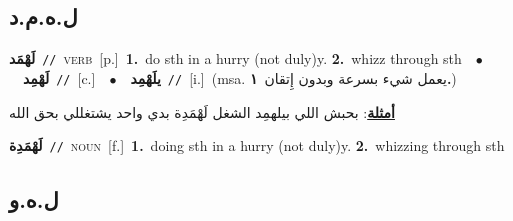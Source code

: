 \documentclass[10pt,a4paper,twoside]{article} %
\begin{document}
\begin{multicols}{2}
\vspace{-3mm}
\subsection*{\color{blue}\foreignlanguage{arabic}{ل.ه.م.د}\color{blue}{}} 

{\setlength\topsep{0pt}\textbf{\foreignlanguage{arabic}{لَهْمَد}}\ {\color{gray}\texttt{//}\color{black}}\ \textsc{verb}\ [p.]\ \textbf{1.}~do sth in a hurry (not duly)y.  \textbf{2.}~whizz through sth\ \ $\bullet$\ \ \setlength\topsep{0pt}\textbf{\foreignlanguage{arabic}{لَهْمِد}}\ {\color{gray}\texttt{//}\color{black}}\ [c.]\ \ $\bullet$\ \ \setlength\topsep{0pt}\textbf{\foreignlanguage{arabic}{يلَهْمِد}}\ {\color{gray}\texttt{//}\color{black}}\ [i.]\ \color{gray}(msa. \foreignlanguage{arabic}{يعمل شيء بسرعة وبدون إِتقان}~\foreignlanguage{arabic}{\textbf{١.}})\color{black}\  \begin{flushright}\color{gray}\foreignlanguage{arabic}{\textbf{\underline{\foreignlanguage{arabic}{أمثلة}}}: بحبش اللي بيلهمِد الشغل لَهْمَدِة بدي واحد يشتغللي بحق الله}\end{flushright}\color{black}} \vspace{2mm}

{\setlength\topsep{0pt}\textbf{\foreignlanguage{arabic}{لَهْمَدِة}}\ {\color{gray}\texttt{//}\color{black}}\ \textsc{noun}\ [f.]\ \textbf{1.}~doing sth in a hurry (not duly)y.  \textbf{2.}~whizzing through sth\ } \vspace{2mm}

\vspace{-3mm}
\subsection*{\color{blue}\foreignlanguage{arabic}{ل.ه.و}\color{blue}{}} 


\end{multicols}
\end{document}
